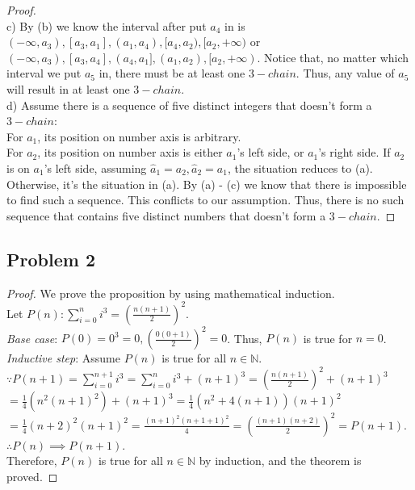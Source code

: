 \documentclass{article}
\begin{document}
\begin{proof}
\\ c) By (b) we know the interval after put $a_4$ in is $(-\infty, a_3), [a_3, a_1], (a_1, a_4), [a_4, a_2), [a_2, +\infty)$ or $(-\infty, a_3), [a_3, a_4], (a_4, a_1], (a_1, a_2), [a_2, +\infty)$. Notice that, no matter which interval we put $a_5$ in, there must be at least one $3-chain$. Thus, any value of $a_5$ will result in at least one $3-chain$.
\\ d) Assume there is a sequence of five distinct integers that doesn't form a $3-chain$:
\\ For $a_1$, its position on number axis is arbitrary.
\\ For $a_2$, its position on number axis is either $a_1$'s left side, or $a_1$'s right side. If $a_2$ is on $a_1$'s left side, assuming $\hat{a}_1 = a_2, \hat{a}_2 = a_1$, the situation reduces to (a). Otherwise, it's the situation in (a). By (a) - (c) we know that there is impossible to find such a sequence. This conflicts to our assumption. Thus, there is no such sequence that contains five distinct numbers that doesn't form a $3-chain$.
\end{proof}
\subsection{Problem 2}
\begin{proof}
We prove the proposition by using mathematical induction.
\\ Let $P(n): \sum_{i=0}^n i^3 = (\frac{n(n+1)}{2})^2$.
\\ \textit{Base case}: $P(0) = 0^3 = 0, (\frac{0(0+1)}{2})^2 = 0$. Thus, $P(n)$ is true for $n=0$.
\\ \textit{Inductive step}: Assume $P(n)$ is true for all $n \in \mathbb{N}$.
\\ $\because P(n+1) = \sum_{i=0}^{n+1} i^3 = \sum_{i=0}^n i^3 + (n+1)^3 = (\frac{n(n+1)}{2})^2 + (n+1)^3$
\\ $= \frac{1}{4}(n^2(n+1)^2) + (n+1)^3 = \frac{1}{4}(n^2+4(n+1))(n+1)^2$
\\ $= \frac{1}{4}(n+2)^2(n+1)^2 = \frac{(n+1)^2(n+1+1)^2}{4} = (\frac{(n+1)(n+2)}{2})^2 = P(n+1)$.
\\ $\therefore P(n) \implies P(n+1)$.
\\ Therefore, $P(n)$ is true for all $n \in \mathbb{N}$ by induction, and the theorem is proved.
\end{proof}
\end{document}
